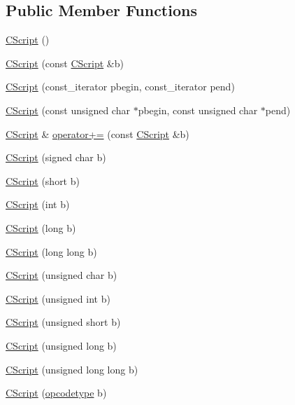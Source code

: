 \subsection*{Public Member Functions}
\begin{DoxyCompactItemize}
\item 
\hyperlink{class_c_script_a92271d96c283ee9de8d73f42456ff363}{C\+Script} ()
\item 
\hyperlink{class_c_script_a32037617a2648c826f3685d17a46d6cf}{C\+Script} (const \hyperlink{class_c_script}{C\+Script} \&b)
\item 
\hyperlink{class_c_script_a06a47661695214630a2f41d4019b20f5}{C\+Script} (const\+\_\+iterator pbegin, const\+\_\+iterator pend)
\item 
\hyperlink{class_c_script_aa8d9ad6ecd9662b423b73294783396ce}{C\+Script} (const unsigned char $\ast$pbegin, const unsigned char $\ast$pend)
\item 
\hyperlink{class_c_script}{C\+Script} \& \hyperlink{class_c_script_af5c72a9c725a2c4f1432cc214d54cfd7}{operator+=} (const \hyperlink{class_c_script}{C\+Script} \&b)
\item 
\hyperlink{class_c_script_a56509326653f847006c21c70938cb896}{C\+Script} (signed char b)
\item 
\hyperlink{class_c_script_ad9275154073efebbeb1da8a81f1ad981}{C\+Script} (short b)
\item 
\hyperlink{class_c_script_ac0fdbf14458c5c33713a51582cdf1507}{C\+Script} (int b)
\item 
\hyperlink{class_c_script_a41d7433a08d75a1cd9f7cd449d07341c}{C\+Script} (long b)
\item 
\hyperlink{class_c_script_a2d77d733e711257c7481117b5dfb9945}{C\+Script} (long long b)
\item 
\hyperlink{class_c_script_ae1842fefe5cb1e9a8dd5b1fa6db12741}{C\+Script} (unsigned char b)
\item 
\hyperlink{class_c_script_a1e0a3f8b4dc8242c5a4999b03c2a29bb}{C\+Script} (unsigned int b)
\item 
\hyperlink{class_c_script_a00ae1d612664442f4bebc03a73ac53b1}{C\+Script} (unsigned short b)
\item 
\hyperlink{class_c_script_af3752b74d2be0a0369656da523a1323a}{C\+Script} (unsigned long b)
\item 
\hyperlink{class_c_script_a87b5b220479a53bd33de58aa58517cd8}{C\+Script} (unsigned long long b)
\item 
\hyperlink{class_c_script_a8214376dea81245d33a44a2ea7c2cdc3}{C\+Script} (\hyperlink{script_8h_a63e349a6089a54da9fe09a3d858648bd}{opcodetype} b)

\end{DoxyCompactItemize}
